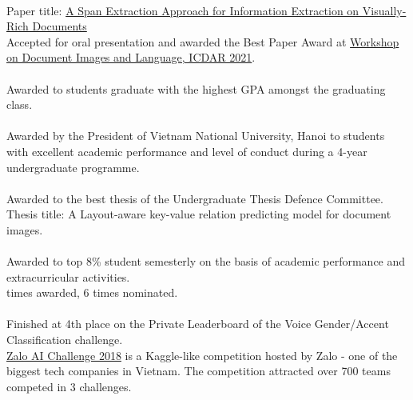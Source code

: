 \\
Paper title: \href{https://aps.arxiv.org/abs/2106.00978}{A Span Extraction Approach for Information Extraction on Visually-Rich Documents}\\
\indent Accepted for oral presentation and awarded the Best Paper Award at \href{https://dil2021.github.io/index.html}{Workshop on Document Images and Language, ICDAR 2021}.\\

\\
Awarded to students graduate with the highest GPA amongst the graduating class.\\

\\
Awarded by the President of Vietnam National University, Hanoi to students with excellent academic performance and level of conduct during a 4-year undergraduate programme.\\

\\
Awarded to the best thesis of the Undergraduate Thesis Defence Committee.\\
\indent Thesis title: A Layout-aware key-value relation predicting model for document images.\\

\\
Awarded to top 8\% student semesterly on the basis of academic performance and extracurricular activities.\\
 times awarded, 6 times nominated.\\

\\
Finished at 4th place on the Private Leaderboard of the Voice Gender/Accent Classification challenge.\\
\indent \href{https://challenge.zalo.ai}{Zalo AI Challenge 2018} is a Kaggle-like competition hosted by Zalo - one of the biggest tech companies in Vietnam. The competition attracted over 700 teams competed in 3 challenges.\\